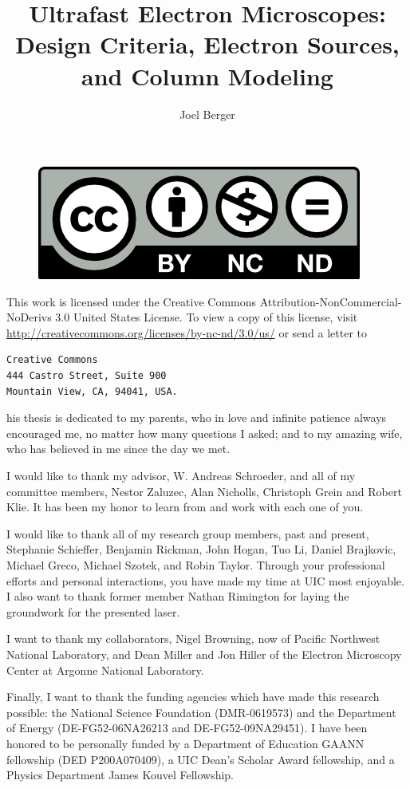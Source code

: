 \documentclass{uicthesi}
\title{Ultrafast Electron Microscopes: Design Criteria, Electron Sources, and Column Modeling}
\author{Joel Berger}
\begin{document}
\maketitle

\newpage
\begin{figure}
  \centering
  \includegraphics{by-nc-nd}
\end{figure}
This work is licensed under the Creative Commons Attribution-NonCommercial-NoDerivs 3.0 United States License.
To view a copy of this license, visit \url{http://creativecommons.org/licenses/by-nc-nd/3.0/us/} or send a letter to
\begin{verbatim}
Creative Commons
444 Castro Street, Suite 900
Mountain View, CA, 94041, USA.
\end{verbatim}


\dedication
This thesis is dedicated to my parents, who in love and infinite patience always encouraged me, no matter how many questions I asked; and to my amazing wife, who has believed in me since the day we met. 
 
\acknowledgment
I would like to thank my advisor, W. Andreas Schroeder, and all of my committee members, Nestor Zaluzec, %
Alan Nicholls, %
Christoph Grein and Robert Klie.
It has been my honor to learn from and work with each one of you.

I would like to thank all of my research group members, past and present, Stephanie Schieffer, Benjamin Rickman, John Hogan, Tuo Li, Daniel Brajkovic, Michael Greco, Michael Szotek, and Robin Taylor.
Through your professional efforts and personal interactions, you have made my time at UIC most enjoyable.
I also want to thank former member Nathan Rimington for laying the groundwork for the presented laser.

I want to thank my collaborators, Nigel Browning, now of Pacific Northwest National Laboratory, and Dean Miller and Jon Hiller of the Electron Microscopy Center at Argonne National Laboratory.

Finally, I want to thank the funding agencies which have made this research possible: 
the National Science Foundation (DMR-0619573) and the Department of Energy (DE-FG52-06NA26213 and DE-FG52-09NA29451).
I have been honored to be personally funded by a Department of Education GAANN fellowship (DED P200A070409), a UIC Dean's Scholar Award fellowship, and a Physics Department James Kouvel Fellowship.
\end{document}
